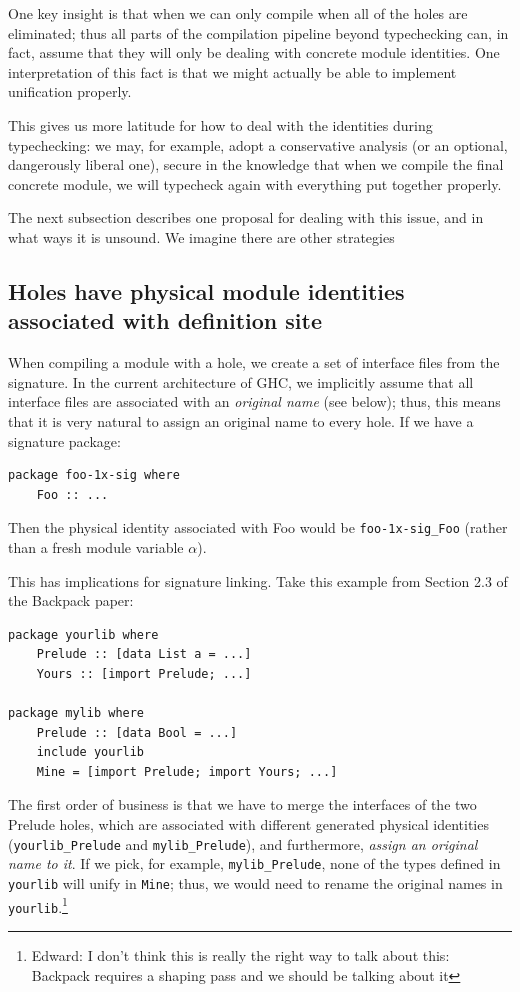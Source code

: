 \documentclass{article}
\begin{document}
One key insight is that when we can only compile when all of the holes
are eliminated; thus all parts of the compilation pipeline beyond
typechecking can, in fact, assume that they will only be dealing with
concrete module identities.  One interpretation of this fact is that
we might actually be able to implement unification properly.

This gives us more latitude for how to
deal with the identities during typechecking: we may, for example,
adopt a conservative analysis (or an optional, dangerously liberal one),
secure in the knowledge that when we compile the final concrete module,
we will typecheck again with everything put together properly.

The next subsection describes one proposal for dealing with this issue,
and in what ways it is unsound.  We imagine there are other strategies

\subsection{Holes have physical module identities associated with definition site}

When compiling a module with a hole, we create a set of interface files
from the signature.  In the current architecture of GHC, we implicitly
assume that all interface files are associated with an \emph{original
name} (see below); thus, this means that it is very natural to assign an
original name to every hole.  If we have a signature package:

\begin{verbatim}
package foo-1x-sig where
    Foo :: ...
\end{verbatim}

Then the physical identity associated with Foo would be
\verb|foo-1x-sig_Foo| (rather than a fresh module variable $\alpha$).

This has implications for signature linking. Take this example from
Section 2.3 of the Backpack paper:

\begin{verbatim}
package yourlib where
    Prelude :: [data List a = ...]
    Yours :: [import Prelude; ...]

package mylib where
    Prelude :: [data Bool = ...]
    include yourlib
    Mine = [import Prelude; import Yours; ...]
\end{verbatim}

The first order of business is that we have to merge the interfaces of
the two Prelude holes, which are associated with different generated
physical identities (\verb|yourlib_Prelude| and \verb|mylib_Prelude|),
and furthermore, \emph{assign an original name to it}.  If we pick,
for example, \verb|mylib_Prelude|, none of the types defined in \verb|yourlib|
will unify in \verb|Mine|; thus, we would need to rename the original names
in \verb|yourlib|.\footnote{Edward: I don't think this is really the
right way to talk about this: Backpack requires a shaping pass and we should
be talking about it}
\end{document}
